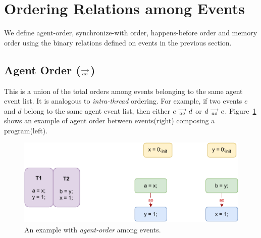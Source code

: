 \section{Ordering Relations among Events}
        
    We define agent-order, synchronize-with order, happens-before order and memory order using the binary relations defined on events in the previous section.
    \subsection{Agent Order ($\stackrel{\longrightarrow}{_{ao}}$)}
        This is a union of the total orders among events belonging to the same agent event list. 
        It is analogous to \textit{intra-thread} ordering. 
        For example, if two events $e$ and $d$ belong to the same agent event list, then either $e\stackrel{\longrightarrow}{_{ao}}d$ or $d\stackrel{\longrightarrow}{_{ao}}e$. 
        Figure~\ref{model:agent-order} shows an example of agent order between events(right) composing a program(left).
        \begin{figure}[H]
            \centering
            \includegraphics[scale=0.7]{3.ECMAScriptMemoryModel/AgentOrder.pdf}
            \caption{An example with \textit{agent-order} among events.}
            \label{model:agent-order}
        \end{figure}
    
